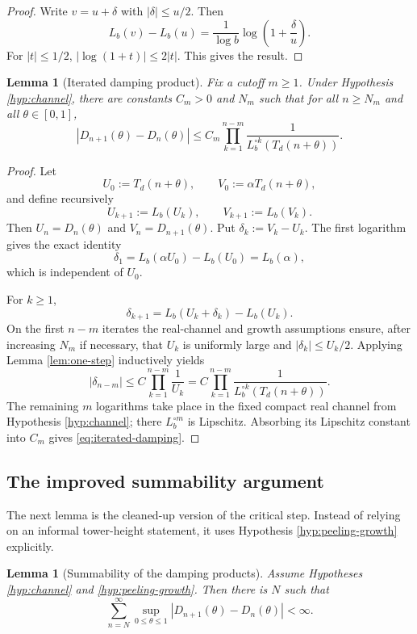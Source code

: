 \documentclass[11pt,a4paper]{article}
\theoremstyle{plain}
\newtheorem{lemma}[theorem]{Lemma}
\theoremstyle{definition}
\theoremstyle{remark}
\newcommand{\abs}[1]{\left\lvert #1\right\rvert}
\begin{document}
\begin{proof}
Write $v=u+\delta$ with $\abs{\delta}\leq u/2$.  Then
\[
  L_b(v)-L_b(u)=\frac{1}{\log b}\log\left(1+\frac{\delta}{u}\right).
\]
For $\abs{t}\leq1/2$, $\abs{\log(1+t)}\leq2\abs{t}$.  This gives the result.
\end{proof}

\begin{lemma}[Iterated damping product]\label{lem:iterated-damping}
Fix a cutoff $m\geq1$.  Under Hypothesis \ref{hyp:channel}, there are constants $C_m>0$ and $N_m$ such that for all $n\geq N_m$ and all $\theta\in[0,1]$,
\begin{equation}\label{eq:iterated-damping}
  \abs{D_{n+1}(\theta)-D_n(\theta)}
  \leq C_m\prod_{k=1}^{n-m}\frac{1}{L_b^{\circ k}(T_d(n+\theta))}.
\end{equation}
\end{lemma}

\begin{proof}
Let
\[
  U_0:=T_d(n+\theta),\qquad V_0:=\alpha T_d(n+\theta),
\]
and define recursively
\[
  U_{k+1}:=L_b(U_k),\qquad V_{k+1}:=L_b(V_k).
\]
Then $U_n=D_n(\theta)$ and $V_n=D_{n+1}(\theta)$.  Put $\delta_k:=V_k-U_k$.  The first logarithm gives the exact identity
\[
  \delta_1=L_b(\alpha U_0)-L_b(U_0)=L_b(\alpha),
\]
which is independent of $U_0$.

For $k\geq1$,
\[
  \delta_{k+1}=L_b(U_k+\delta_k)-L_b(U_k).
\]
On the first $n-m$ iterates the real-channel and growth assumptions ensure, after increasing $N_m$ if necessary, that $U_k$ is uniformly large and $\abs{\delta_k}\leq U_k/2$.  Applying Lemma \ref{lem:one-step} inductively yields
\[
  \abs{\delta_{n-m}}
  \leq C\prod_{k=1}^{n-m}\frac{1}{U_k}
  =C\prod_{k=1}^{n-m}\frac{1}{L_b^{\circ k}(T_d(n+\theta))}.
\]
The remaining $m$ logarithms take place in the fixed compact real channel from Hypothesis \ref{hyp:channel}; there $L_b^{\circ m}$ is Lipschitz.  Absorbing its Lipschitz constant into $C_m$ gives \eqref{eq:iterated-damping}.
\end{proof}

\subsection{The improved summability argument}

The next lemma is the cleaned-up version of the critical step.  Instead of relying on an informal tower-height statement, it uses Hypothesis \ref{hyp:peeling-growth} explicitly.

\begin{lemma}[Summability of the damping products]\label{lem:summability}
Assume Hypotheses \ref{hyp:channel} and \ref{hyp:peeling-growth}.  Then there is $N$ such that
\begin{equation}\label{eq:summability}
  \sum_{n=N}^{\infty}\sup_{0\leq\theta\leq1}\abs{D_{n+1}(\theta)-D_n(\theta)}<\infty.
\end{equation}
\end{lemma}
\end{document}
